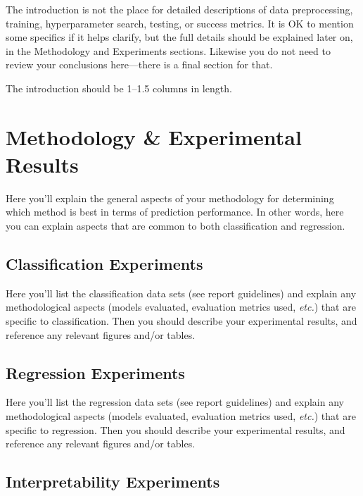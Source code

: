 \documentclass[10pt,twocolumn,letterpaper]{article}
\begin{document}
The introduction is not the place for detailed descriptions of data preprocessing,
training, hyperparameter search, testing, or success metrics.
It is OK to mention some specifics if it helps clarify, but the full details
should be explained later on, in the Methodology and Experiments sections.
Likewise you do not need to review your conclusions here---there
is a final section for that.

The introduction should be 1--1.5 columns in length.



\section{Methodology \& Experimental Results}

Here you'll explain the general aspects of your methodology for determining which
method is best in terms of prediction performance.
In other words, here you can explain aspects that are common to both classification and regression.

\subsection{Classification Experiments}

Here you'll list the classification data sets (see report guidelines) and explain any methodological
aspects (models evaluated, evaluation metrics used, {\em etc.}) that are specific to classification.
Then you should describe your experimental results,
and reference any relevant figures and/or tables.

\subsection{Regression Experiments}

Here you'll list the regression data sets (see report guidelines) and explain any methodological
aspects (models evaluated, evaluation metrics used, {\em etc.}) that are specific to regression.
Then you should describe your experimental results,
and reference any relevant figures and/or tables.

\subsection{Interpretability Experiments}
\end{document}
